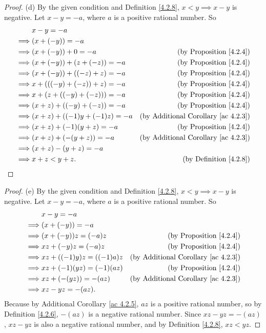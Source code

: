 \begin{proof}{(d)}
By the given condition and Definition \ref{4.2.8}, \(x < y \implies x - y\) is negative.
Let \(x - y = -a\), where \(a\) is a positive rational number.
So
\begin{align*}
& x - y = -a \\
\implies & (x + (-y)) = -a \\
\implies & (x + (-y)) + 0 = -a & \text{(by Proposition \ref{4.2.4})} \\
\implies & (x + (-y)) + (z + (-z)) = -a & \text{(by Proposition \ref{4.2.4})} \\
\implies & (x + (-y)) + ((-z) + z) = -a & \text{(by Proposition \ref{4.2.4})} \\
\implies & x + (((-y) + (-z)) + z) = -a & \text{(by Proposition \ref{4.2.4})} \\
\implies & x + (z + ((-y) + (-z))) = -a & \text{(by Proposition \ref{4.2.4})} \\
\implies & (x + z) + ((-y) + (-z)) = -a & \text{(by Proposition \ref{4.2.4})} \\
\implies & (x + z) + ((-1)y + (-1)z) = -a & \text{(by Additional Corollary \ref{ac 4.2.3})} \\
\implies & (x + z) + (-1)(y + z) = -a & \text{(by Proposition \ref{4.2.4})} \\
\implies & (x + z) + (-(y + z)) = -a & \text{(by Additional Corollary \ref{ac 4.2.3})} \\
\implies & (x + z) - (y + z) = -a \\
\implies & x + z < y + z. & \text{(by Definition \ref{4.2.8})} \\
\end{align*}
\end{proof}

\begin{proof}{(e)}
By the given condition and Definition \ref{4.2.8}, \(x < y \implies x - y\) is negative.
Let \(x - y = -a\), where \(a\) is a positive rational number.
So
\begin{align*}
& x - y = -a \\
\implies & (x + (-y)) = -a \\
\implies & (x + (-y))z = (-a)z & \text{(by Proposition \ref{4.2.4})} \\
\implies & xz + (-y)z = (-a)z & \text{(by Proposition \ref{4.2.4})} \\
\implies & xz + ((-1)y)z = ((-1)a)z & \text{(by Additional Corollary \ref{ac 4.2.3})} \\
\implies & xz + (-1)(yz) = (-1)(az) & \text{(by Proposition \ref{4.2.4})} \\
\implies & xz + (-(yz)) = -(az) & \text{(by Additional Corollary \ref{ac 4.2.3})} \\
\implies & xz - yz = -(az).
\end{align*}
Because by Additional Corollary \ref{ac 4.2.5}, \(az\) is a positive rational number, so by Definition \ref{4.2.6}, \(-(az)\) is a negative rational number.
Since \(xz - yz = -(az)\), \(xz - yz\) is also a negative rational number, and by Definition \ref{4.2.8}, \(xz < yz\).
\end{proof}

